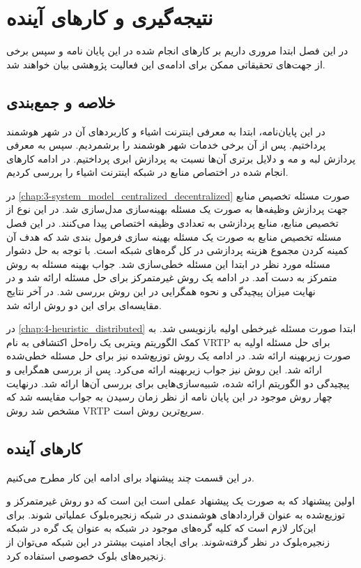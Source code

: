 \chapter{نتیجه‌گیری و کار‌های آینده}\label{chap:conclusion}
  \thispagestyle{empty}
  در این فصل ابتدا مروری داریم بر کار‌های انجام شده در این پایان نامه و سپس برخی از جهت‌های تحقیقاتی ممکن برای ادامه‌ی این فعالیت پژوهشی بیان خواهند شد.

  \section{خلاصه و جمع‌بندی}
    در این پایان‌نامه، ابتدا به معرفی اینترنت اشیاء و کاربرد‌های آن در شهر هوشمند پرداختیم.
    پس از آن برخی خدمات شهر هوشمند را برشمردیم.
    سپس به معرفی پردازش لبه و مه و دلایل برتری آن‌ها نسبت به پردازش ابری پرداختیم.
    در ادامه کار‌های انجام شده در اختصاص منابع در شبکه اینترنت اشیاء را بررسی کردیم.

    در \cref{chap:3-system_model_centralized_decentralized} صورت مسئله تخصیص منابع جهت پردازش وظیفه‌ها به صورت یک مسئله بهینه‌سازی مدل‌سازی شد. 
    در این نوع از تخصیص منابع، منابع پردازشی به تعدادی وظیفه اختصاص پیدا می‌کنند.
    در این فصل مسئله تخصیص منابع به صورت یک مسئله بهینه سازی فرمول بندی شد که هدف آن کمینه کردن مجموع هزینه پردازشی در کل گره‌های شبکه است.
    با توجه به حل دشوار مسئله مورد نظر در ابتدا این مسئله خطی‌سازی شد. جواب بهینه مسئله به روش متمرکز به دست آمد.
    در ادامه یک روش غیرمتمرکز برای حل مسئله ارائه شد و در نهایت میزان پیچیدگی و نحوه همگرایی در این روش بررسی شد. در آخر نتایج مقایسه‌ای برای این دو روش ارائه شد.

    در \cref{chap:4-heuristic_distributed} ابتدا صورت مسئله غیرخطی اولیه بازنویسی شد.
    به کمک الگوریتم ویتربی یک راه‌حل اکتشافی به نام VRTP برای حل مسئله اولیه به صورت زیر‌بهینه ارائه شد.
	در ادامه یک روش توزیع‌شده نیز برای حل مسئله خطی‌‌شده ارائه شد. این روش نیز جواب زیربهینه ارائه می‌کرد. 
    پس از بررسی همگرایی و پیچیدگی دو الگوریتم ارائه شده، شبیه‌سازی‌هایی برای بررسی آن‌ها ارائه شد.
    درنهایت چهار روش موجود در این پایان نامه از نظر زمان رسیدن به جواب مقایسه شد که مشخص شد روش VRTP سریع‌ترین روش است. 

  \section{کار‌های آینده}
    در این قسمت چند پیشنهاد برای ادامه این کار مطرح می‌کنیم.
  
  اولین پیشنهاد که به صورت یک پیشنهاد عملی است این است که دو روش غیرمتمرکز و توزیع‌شده به عنوان قراردادهای هوشمندی در شبکه زنجیره‌‌بلوک عملیاتی شوند. برای این‌کار لازم است که کلیه گره‌های موجود در شبکه به عنوان یک گره در شبکه زنجیره‌بلوک در نظر گرفته‌شوند. برای ایجاد امنیت بیشتر در این شبکه می‌توان از زنجیره‌های بلوک خصوصی استفاده کرد.
  
